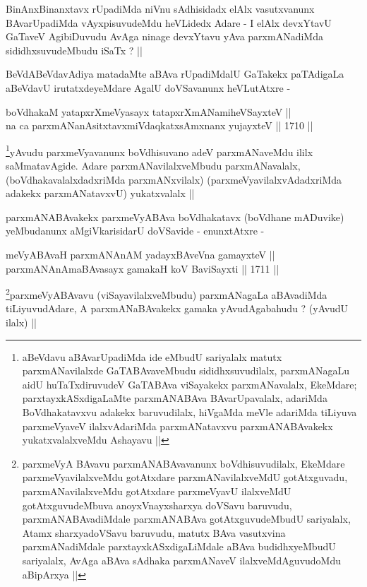 \begin{artha}
BinAnxBinanxtavx rUpadiMda niVnu sAdhisidadx elAlx vasutxvanunx
BAvarUpadiMda vAyxpisuvudeMdu heVLidedx Adare - I elAlx devxYtavU
GaTaveV AgibiDuvudu AvAga ninage  devxYtavu yAva parxmANadiMda
sididhxsuvudeMbudu iSaTx ? ||
\end{artha}

\begin{artha}
BeVdABeVdavAdiya matadaMte aBAva rUpadiMdalU GaTakekx paTAdigaLa
aBeVdavU irutatxdeyeMdare AgalU doVSavanunx heVLutAtxre - 
\end{artha}

\begin{shl}
boVdhakaM yatapxrXmeVyasayx tatapxrXmANamiheVSayxteV || \\
na ca parxmANanAsitxtavxmiVdaqkatxsAmxnanx yujayxteV ||  1710 ||  
\end{shl}

\begin{artha}
\footnote[1]{aBeVdavu aBAvarUpadiMda ide eMbudU sariyalalx matutx
  parxmANavilalxde GaTABAvaveMbudu sididhxsuvudilalx, parxmANagaLu
  aidU huTaTxdiruvudeV GaTABAva viSayakekx parxmANavalalx, EkeMdare;
  parxtayxkASxdigaLaMte parxmANABAva BAvarUpavalalx, adariMda
  BoVdhakatavxvu adakekx baruvudilalx, hiVgaMda meVle adariMda
  tiLiyuva parxmeVyaveV ilalxvAdariMda parxmANatavxvu parxmANABAvakekx
  yukatxvalalxveMdu Ashayavu ||}yAvudu parxmeVyavanunx boVdhisuvano adeV parxmANaveMdu
ililx saMmatavAgide. Adare parxmANavilalxveMbudu parxmANavalalx,
(boVdhakavalalxdadxriMda parxmANxvilalx) (parxmeVyavilalxvAdadxriMda
adakekx parxmANatavxvU) yukatxvalalx ||
\end{artha}

\begin{artha}
parxmANABAvakekx parxmeVyABAva boVdhakatavx (boVdhane mADuvike)
yeMbudanunx aMgiVkarisidarU doVSavide - enunxtAtxre -
\end{artha}

\begin{shl}
meVyABAvaH parxmANAnAM yadayxBAveVna gamayxteV || \\
parxmANAnAmaBAvasayx gamakaH koV BaviSayxti ||  1711 ||  
\end{shl}

\begin{artha}
\footnote[1]{parxmeVyA BAvavu parxmANABAvavanunx boVdhisuvudilalx,
  EkeMdare parxmeVyavilalxveMdu gotAtxdare parxmANavilalxveMdU
  gotAtxguvadu, parxmANavilalxveMdu gotAtxdare parxmeVyavU ilalxveMdU
  gotAtxguvudeMbuva anoyxVnayxsharxya doVSavu baruvudu,
  parxmANABAvadiMdale parxmANABAva gotAtxguvudeMbudU sariyalalx, Atamx
sharxyadoVSavu baruvudu, matutx BAva vasutxvina parxmANadiMdale
parxtayxkASxdigaLiMdale aBAva budidhxyeMbudU sariyalalx, AvAga aBAva
sAdhaka parxmANaveV ilalxveMdAguvudoMdu aBipArxya ||}parxmeVyABAvavu (viSayavilalxveMbudu) parxmANagaLa
aBAvadiMda tiLiyuvudAdare, A parxmANaBAvakekx gamaka yAvudAgabahudu ?
(yAvudU ilalx) ||
\end{artha}

